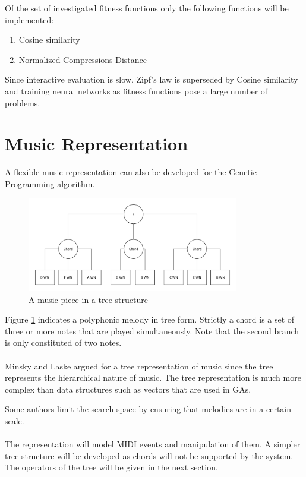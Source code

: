 Of the set of investigated fitness functions only the following functions will be implemented:
\begin{enumerate}
\item Cosine similarity
\item Normalized Compressions Distance
\end{enumerate}
Since interactive evaluation is slow, Zipf's law is superseded by Cosine similarity and training neural networks as fitness functions pose a large number of problems.

\section{Music Representation}
A flexible music representation can also be developed for the Genetic Programming algorithm. 

\begin{figure}
\center
\includegraphics[width=350px]{../images/tree_stuct_piece.pdf}
\caption{A music piece in a tree structure}
\label{ims:musicpieceextrree}
\end{figure}
Figure \ref{ims:musicpieceextrree} indicates a polyphonic melody in tree form. Strictly a chord is a set of three or more notes that are played simultaneously. Note that the second branch is only constituted of two notes.
\\
\\
Minsky and Laske \cite{Minsky1992} argued for a tree representation of music since the tree represents the hierarchical nature of music. The tree representation is much more complex than data structures such as vectors that are used in \acp{GA}.

Some authors \cite{Biles1994} limit the search space by ensuring that melodies are in a certain scale.
\\
\\
The representation will model \ac{MIDI} events and manipulation of them. A simpler tree structure will be developed as chords will not be supported by the system. The operators of the tree will be given in the next section.

